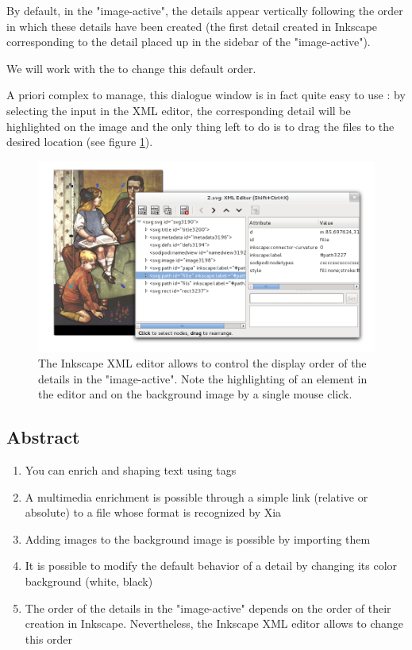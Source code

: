 By default, in the "image-active", the details appear vertically following the order in which these details have been created (the first detail created in Inkscape corresponding to the detail placed up in the sidebar of the "image-active").

We will work with the  to change this default order.

A priori complex to manage, this dialogue window is in fact quite easy to use : 
by selecting the input in the XML editor, the corresponding detail will be
highlighted on the image and the only thing left 
to do is to drag the files to the desired location (see figure \ref{ordre_couches}).

\begin{figure}[htp]
 \centering
 \includegraphics[width=\textwidth]{images/ordre_couches}
 \caption{The Inkscape XML editor allows to control the display order of the details in the "image-active". Note the highlighting of an element  
in the editor and on the background image by a single mouse click.}
 \label{ordre_couches}
\end{figure}

\subsection{Abstract}

\begin{enumerate}
 \item You can enrich and shaping text using tags
 \item A multimedia enrichment is possible through a simple link (relative
or absolute) to a file whose format is recognized by Xia
 \item Adding images to the background image is possible by importing them
 \item It is possible to modify the default behavior of a detail by changing its color 
background (white, black)
 \item The order of the details in the "image-active" depends on the order
of their creation in Inkscape. Nevertheless, the Inkscape XML editor allows to change this order
\end{enumerate}


